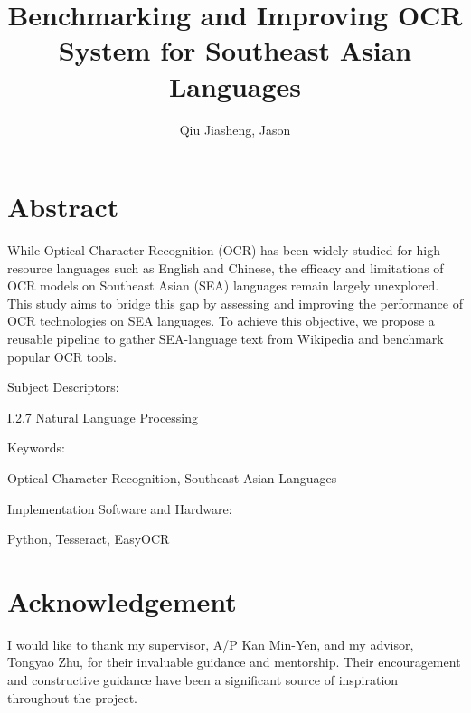 \documentclass[12pt,oneside]{memoir}
\title{Benchmarking and Improving OCR System for Southeast Asian Languages}
\author{Qiu Jiasheng, Jason}
\begin{document}
\frontmatter

\pagestyle{plain}

\makecover

\setcounter{page}{1}

\maketitle

\chapter{Abstract}
While Optical Character Recognition (OCR) has been widely studied for high-resource languages such as English and Chinese, the efficacy and limitations of OCR models on Southeast Asian (SEA) languages remain largely unexplored.
This study aims to bridge this gap by assessing and improving the performance of OCR technologies on SEA languages.
To achieve this objective, we propose a reusable pipeline to gather SEA-language text from Wikipedia and benchmark popular OCR tools.

\vspace{20pt}
Subject Descriptors:
\begin{adjustwidth}{0.7in}{}
    I.2.7 Natural Language Processing
\end{adjustwidth}

Keywords:
\begin{adjustwidth}{0.7in}{}
    Optical Character Recognition, Southeast Asian Languages
\end{adjustwidth}

Implementation Software and Hardware:
\begin{adjustwidth}{0.7in}{}
    Python, Tesseract, EasyOCR
\end{adjustwidth}

\chapter{Acknowledgement}
I would like to thank my supervisor, A/P Kan Min-Yen, and my advisor, Tongyao Zhu, for their invaluable guidance and mentorship. Their encouragement and constructive guidance have been a significant source of inspiration throughout the project.

\listoftables

\tableofcontents

\mainmatter
\end{document}
